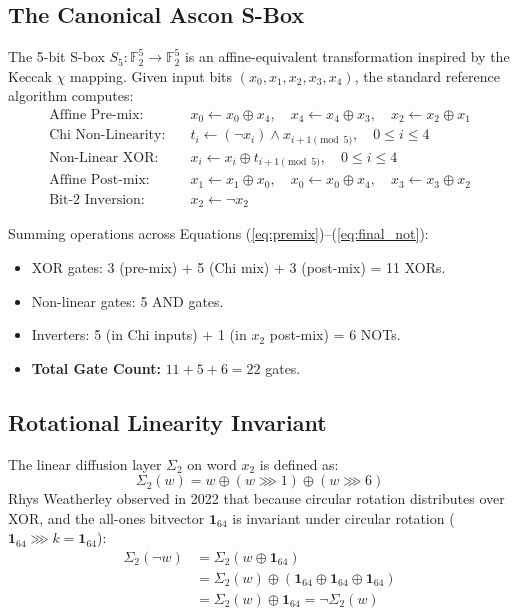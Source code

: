 \documentclass[journal,10pt]{IEEEtran}
\begin{document}
\subsection{The Canonical Ascon S-Box}
The 5-bit S-box $S_5 : \mathbb{F}_2^5 \to \mathbb{F}_2^5$ is an affine-equivalent transformation inspired by the Keccak $\chi$ mapping. Given input bits $(x_0, x_1, x_2, x_3, x_4)$, the standard reference algorithm computes:
\begin{align}
\text{Affine Pre-mix:} \quad & x_0 \leftarrow x_0 \oplus x_4, \quad x_4 \leftarrow x_4 \oplus x_3, \quad x_2 \leftarrow x_2 \oplus x_1 \label{eq:premix}\\
\text{Chi Non-Linearity:} \quad & t_i \leftarrow (\neg x_i) \land x_{i+1 \pmod 5}, \quad 0 \le i \le 4 \label{eq:chi}\\
\text{Non-Linear XOR:} \quad & x_i \leftarrow x_i \oplus t_{i+1 \pmod 5}, \quad 0 \le i \le 4 \label{eq:mix}\\
\text{Affine Post-mix:} \quad & x_1 \leftarrow x_1 \oplus x_0, \quad x_0 \leftarrow x_0 \oplus x_4, \quad x_3 \leftarrow x_3 \oplus x_2 \label{eq:postmix}\\
\text{Bit-2 Inversion:} \quad & x_2 \leftarrow \neg x_2 \label{eq:final_not}
\end{align}

Summing operations across Equations (\ref{eq:premix})--(\ref{eq:final_not}):
\begin{itemize}
    \item XOR gates: 3 (pre-mix) + 5 (Chi mix) + 3 (post-mix) = 11 XORs.
    \item Non-linear gates: 5 AND gates.
    \item Inverters: 5 (in Chi inputs) + 1 (in $x_2$ post-mix) = 6 NOTs.
    \item \textbf{Total Gate Count:} $11 + 5 + 6 = 22$ gates.
\end{itemize}

\subsection{Rotational Linearity Invariant}
The linear diffusion layer $\Sigma_2$ on word $x_2$ is defined as:
\begin{equation}
\Sigma_2(w) = w \oplus (w \ggg 1) \oplus (w \ggg 6)
\end{equation}
Rhys Weatherley observed in 2022 \cite{weatherley_ascon} that because circular rotation distributes over XOR, and the all-ones bitvector $\mathbf{1}_{64}$ is invariant under circular rotation ($\mathbf{1}_{64} \ggg k = \mathbf{1}_{64}$):
\begin{align}
\Sigma_2(\neg w) &= \Sigma_2(w \oplus \mathbf{1}_{64}) \nonumber \\
&= \Sigma_2(w) \oplus (\mathbf{1}_{64} \oplus \mathbf{1}_{64} \oplus \mathbf{1}_{64}) \nonumber \\
&= \Sigma_2(w) \oplus \mathbf{1}_{64} = \neg \Sigma_2(w)
\end{align}
\end{document}
